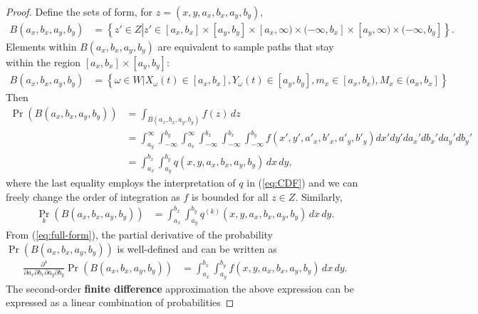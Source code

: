 \begin{proof}
  Define the sets of form, for $z = (x,y,a_x,b_x,a_y,b_y)$,
  \begin{align*}
    B(a_x, b_x, a_y, b_y) &= \left\{ z' \in Z \left| z' \in [a_x, b_x]
        \times [a_y, b_y] \times [a_x, \infty) \times (-\infty, b_x]
                            \times [a_y, \infty) \times (-\infty, b_y] \right.\right\}.
  \end{align*}
  Elements within $B(a_x, b_x, a_y, b_y)$ are equivalent to sample
  paths that stay within the region $[a_x, b_x] \times [a_y, b_y]$:
  \begin{align*}
    B(a_x, b_x, a_y, b_y) &= \left\{ \omega \in W | X_\omega(t) \in [a_x, b_x], Y_\omega(t) \in [a_y, b_y], m_x \in [a_x,b_x), M_x \in (a_x, b_x] \right\}
  \end{align*}
  Then
  \begin{align}
    \Pr(B(a_x, b_x, a_y, b_y)) &= \displaystyle \int_{B(a_x, b_x, a_y, b_y)} f(z)\, dz \nonumber \\
                               &= \displaystyle \int_{a_y}^{\infty} \displaystyle \int_{-\infty}^{b_y} \displaystyle \int_{a_x}^{\infty} \displaystyle \int_{-\infty}^{b_x} \displaystyle \int_{-\infty}^{b_x} \displaystyle \int_{-\infty}^{b_y} f(x', y', a'_x, b'_x, a'_y, b'_y) dx' dy' da_x' db_x' da_y' db_y' \label{eq:full-form} \\
                               &= \displaystyle \int_{a_x}^{b_x} \displaystyle \int_{a_y}^{b_y} q(x,y,a_x,b_x,a_y,b_y)\, dx\, dy, \nonumber
  \end{align}
  where the last equality employs the interpretation of $q$ in
  (\ref{eq:CDF}) and we can freely change the order of integration as
  $f$ is bounded for all $z \in Z$. Similarly,
  \begin{align*}
    \Pr_k(B(a_x, b_x, a_y, b_y)) &= \displaystyle \int_{a_x}^{b_x} \displaystyle \int_{a_y}^{b_y} q^{(k)}(x,y,a_x,b_x,a_y,b_y)\, dx\, dy.
  \end{align*}
  From (\ref{eq:full-form}), the partial derivative of the probability
  $\Pr(B(a_x,b_x,a_y,b_y))$ is well-defined and can be written as
  \begin{align*}
    \frac{\partial^4}{\partial a_x \partial b_x \partial a_y \partial b_y} \Pr(B(a_x, b_x, a_y, b_y)) &= \displaystyle \int_{a_x}^{b_x} \displaystyle \int_{a_y}^{b_y} f(x,y,a_x,b_x,a_y,b_y)\, dx\, dy.
  \end{align*}
  The second-order \textbf{finite difference} approximation the above
  expression can be expressed as a linear combination of probabilities

\end{proof}
